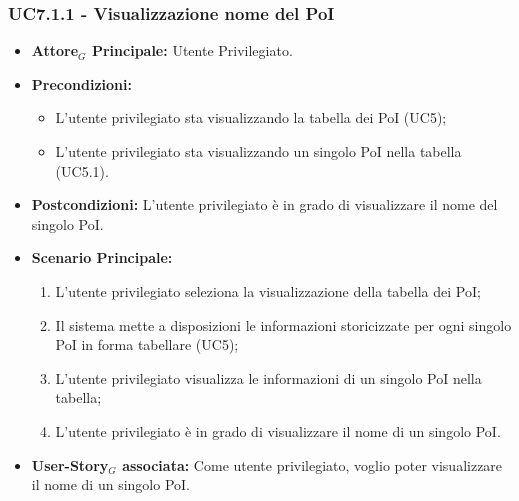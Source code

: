 \documentclass[11pt]{article}
\begin{document}
\begin{justify}
\subsubsection{\textbf{UC7.1.1 - Visualizzazione nome del PoI}}
\label{UC7.1.1}
\begin{itemize}
    \item \textbf{Attore$_G$ Principale:} Utente Privilegiato.
    \item \textbf{Precondizioni:} 
        \begin{itemize}
          \item L'utente privilegiato sta visualizzando la tabella dei PoI (UC5);
            \item L'utente privilegiato sta visualizzando un singolo PoI nella tabella (UC5.1).
        \end{itemize}
      \item \textbf{Postcondizioni:} L'utente privilegiato è in grado di visualizzare il nome del singolo PoI.\\
    \item \textbf{Scenario Principale:} 
        \begin{enumerate}
        \item L'utente privilegiato seleziona la visualizzazione della tabella dei PoI;
          \item Il sistema mette a disposizioni le informazioni storicizzate per ogni singolo PoI in forma tabellare (UC5);
          \item L'utente privilegiato visualizza le informazioni di un singolo PoI nella tabella;
            \item L'utente privilegiato è in grado di visualizzare il nome di un singolo PoI.
        \end{enumerate}
    \item \textbf{User-Story$_G$ associata:} Come utente privilegiato, voglio poter visualizzare il nome di un singolo PoI.
\end{itemize}


\end{justify}
\end{document}
